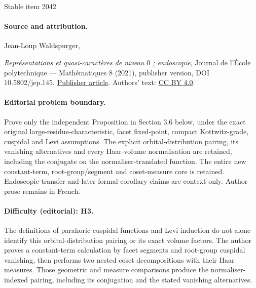 \documentclass[11pt]{article}
\numberwithin{equation}{section}\providecommand{\og}{«\,}\providecommand{\fg}{\,»}
\begin{document}
\begin{center}{\Large Stable item 2042}\end{center}
\paragraph{Source and attribution.}
Jean-Loup Waldspurger,\par\emph{Représentations et quasi-caractères de niveau $0$ ; endoscopie}, Journal de l’École polytechnique — Mathématiques 8 (2021), publisher version, DOI 10.5802/jep.145. \href{https://jep.centre-mersenne.org/articles/10.5802/jep.145/}{Publisher article}. Authors' text: \href{https://creativecommons.org/licenses/by/4.0/}{CC BY 4.0}.
\paragraph{Editorial problem boundary.}
Prove only the independent Proposition in Section 3.6 below, under the exact original large-residue-characteristic, facet fixed-point, compact Kottwitz-grade, cuspidal and Levi assumptions. The explicit orbital-distribution pairing, its vanishing alternatives and every Haar-volume normalisation are retained, including the conjugate on the normaliser-translated function. The entire new constant-term, root-group/segment and coset-measure core is retained. Endoscopic-transfer and later formal corollary claims are context only. Author prose remains in French.
\paragraph{Difficulty (editorial): H3.}
The definitions of parahoric cuspidal functions and Levi induction do not alone identify this orbital-distribution pairing or its exact volume factors. The author proves a constant-term calculation by facet segments and root-group cuspidal vanishing, then performs two nested coset decompositions with their Haar measures. Those geometric and measure comparisons produce the normaliser-indexed pairing, including its conjugation and the stated vanishing alternatives.
\end{document}
